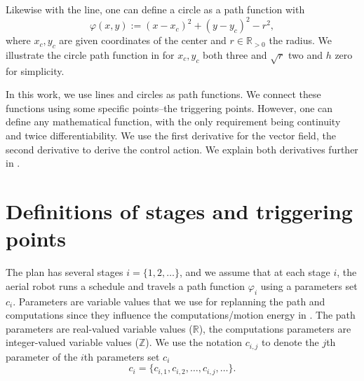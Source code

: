 Likewise with the line, one can define a circle as a path function with
\begin{equation}\label{eq:pathf-circle}
  \varphi(x,y):=(x-x_c)^2+(y-y_c)^2-r^2,
\end{equation}
where $x_c,y_c$ are given coordinates of the center and $r\in\mathbb{R}_{>0}$ the radius. We illustrate the circle path function in  for $x_c,y_c$ both three and $\sqrt{r}$ two and $h$ zero for simplicity. 

In this work, we use lines and circles as path functions. We connect these functions using some specific points--the triggering points. However, one can define any mathematical function, with the only requirement being continuity and twice differentiability. We use the first derivative for the vector field, the second derivative to derive the control action. We explain both derivatives further in .


\section{Definitions of stages and triggering points}
\label{sec:defs-stages-triggs}



The plan has several stages $i=\{1,2,\dots\}$, and we assume that at each stage $i$, the aerial robot runs a schedule and travels a path function $\varphi_i$ using a parameters set $c_i$.
Parameters are variable values that we use for replanning the path and computations since they influence the computations/motion energy in . The path parameters are real-valued variable values ($\mathbb{R}$), the computations parameters are integer-valued variable values ($\mathbb{Z}$). We use the notation  $c_{i,j}$ to denote the $j$th parameter of the $i$th parameters set $c_i$
\begin{equation}
  c_i=\{c_{i,1},c_{i,2},\dots,c_{i,j},\dots\}.
\end{equation}

